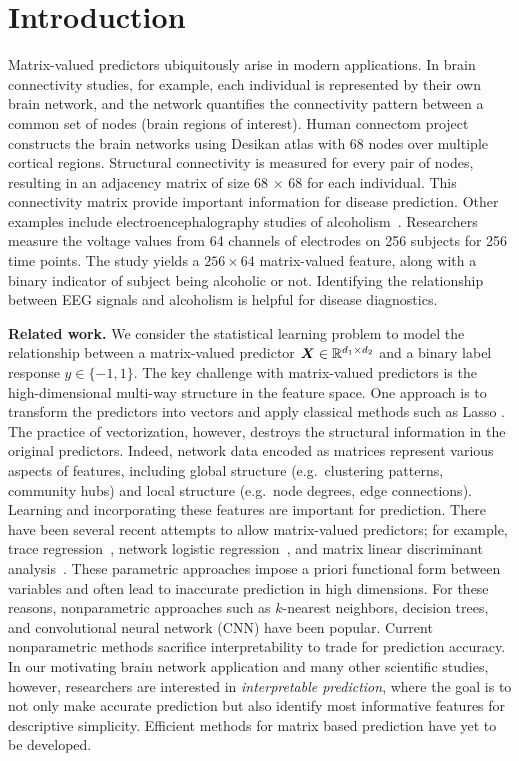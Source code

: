 \documentclass[11pt]{article}
\theoremstyle{definition}
\begin{document}
\vspace{-.5cm}
\section{Introduction }
\vspace{-.5cm}

Matrix-valued predictors ubiquitously arise in modern applications. In brain connectivity studies, for example, each individual is represented by their own brain network, and the network quantifies the connectivity pattern between a common set of nodes (brain regions of interest). Human connectom project~\citep{wang2017bayesian} constructs the brain networks using Desikan atlas with 68 nodes over multiple cortical regions. Structural connectivity is measured for every pair of nodes, resulting in an adjacency matrix of size 68 $\times$ 68 for each individual. This connectivity matrix provide important information for disease prediction. Other examples include electroencephalography studies of alcoholism~\citep{zhou2014regularized}. Researchers measure the voltage values from 64 channels of electrodes on 256 subjects for 256 time points. The study yields a $256 \times 64$ matrix-valued feature, along with a binary indicator of subject being alcoholic or not. Identifying the relationship between EEG signals and alcoholism is helpful for disease diagnostics. 


{\bf Related work.} We consider the statistical learning problem to model the relationship between a matrix-valued predictor $\bm X \in \mathbb{R}^{d_1\times d_2}$ and a binary label response $y\in\{-1,1\}$.  The key challenge with matrix-valued predictors is the high-dimensional multi-way structure in the feature space. One approach is to transform the predictors into vectors and apply classical methods such as Lasso \citep{friedman2010regularization}. The practice of vectorization, however, destroys the structural information in the original predictors. Indeed, network data encoded as matrices represent various aspects of features, including global structure (e.g.\ clustering patterns, community hubs) and local structure (e.g.\ node degrees, edge connections). Learning and incorporating these features are important for prediction. There have been several recent attempts to allow matrix-valued predictors; for example, trace regression~\citep{fan2019generalized}, network logistic regression~\citep{relion2019network}, and matrix linear discriminant analysis~\citep{hu2020matrix}. These parametric approaches impose a priori functional form between variables and often lead to inaccurate prediction in high dimensions. For these reasons, nonparametric approaches such as $k$-nearest neighbors, decision trees, and convolutional neural network (CNN) have been popular. Current nonparametric methods sacrifice interpretability to trade for prediction accuracy. In our motivating brain network application and many other scientific studies, however, researchers are interested in {\it interpretable prediction}, where the goal is to not only make accurate prediction but also identify most informative features for descriptive simplicity. Efficient methods for matrix based prediction have yet to be developed. 
 
\end{document}
